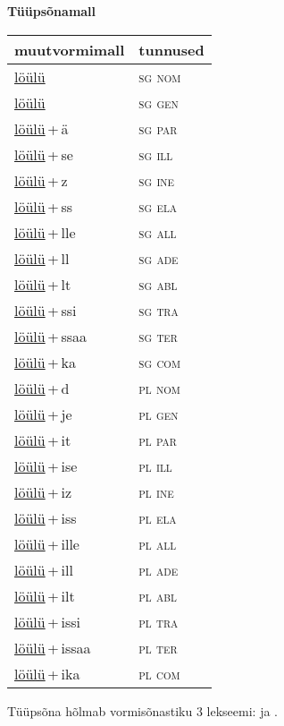 
\vspace{1.8em}
\begin{minipage}{\textwidth}
\textbf{Tüüpsõnamall \,}\\

\begin{sideways}
\begin{tabular}{l l}
muutvormimall & tunnused \\
\hline
\underline{löülü} & \textsc{ sg nom } \\
\underline{löülü} & \textsc{ sg gen } \\
\underline{löülü}\,+\,ä & \textsc{ sg par } \\
\underline{löülü}\,+\,se & \textsc{ sg ill } \\
\underline{löülü}\,+\,z & \textsc{ sg ine } \\
\underline{löülü}\,+\,ss & \textsc{ sg ela } \\
\underline{löülü}\,+\,lle & \textsc{ sg all } \\
\underline{löülü}\,+\,ll & \textsc{ sg ade } \\
\underline{löülü}\,+\,lt & \textsc{ sg abl } \\
\underline{löülü}\,+\,ssi & \textsc{ sg tra } \\
\underline{löülü}\,+\,ssaa & \textsc{ sg ter } \\
\underline{löülü}\,+\,ka & \textsc{ sg com } \\
\underline{löülü}\,+\,d & \textsc{ pl nom } \\
\underline{löülü}\,+\,je & \textsc{ pl gen } \\
\underline{löülü}\,+\,it & \textsc{ pl par } \\
\underline{löülü}\,+\,ise & \textsc{ pl ill } \\
\underline{löülü}\,+\,iz & \textsc{ pl ine } \\
\underline{löülü}\,+\,iss & \textsc{ pl ela } \\
\underline{löülü}\,+\,ille & \textsc{ pl all } \\
\underline{löülü}\,+\,ill & \textsc{ pl ade } \\
\underline{löülü}\,+\,ilt & \textsc{ pl abl } \\
\underline{löülü}\,+\,issi & \textsc{ pl tra } \\
\underline{löülü}\,+\,issaa & \textsc{ pl ter } \\
\underline{löülü}\,+\,ika & \textsc{ pl com } \\
\end{tabular}
\end{sideways}
\label{tab:tüüpsõnamall-löülü}

\end{minipage}

 
\vspace{1em}
\noindent Tüüpsõna hõlmab vormisõnastiku 3 lekseemi:  ja .
